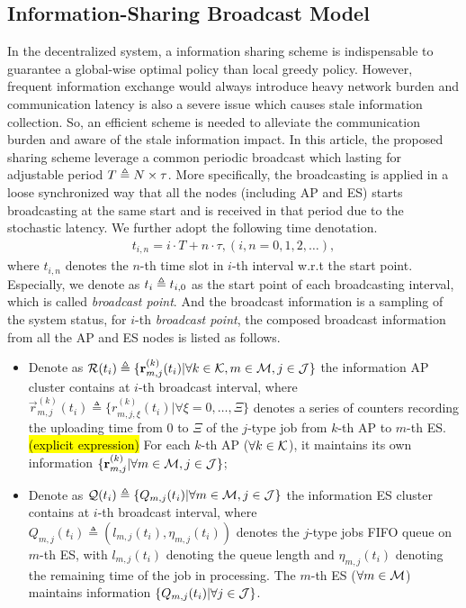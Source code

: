 \subsection{Information-Sharing Broadcast Model}
In the decentralized system, a information sharing scheme is indispensable to guarantee a global-wise optimal policy than local greedy policy.
However, frequent information exchange would always introduce heavy network burden and communication latency is also a severe issue which causes stale information collection. So, an efficient scheme is needed to alleviate the communication burden and aware of the stale information impact.
In this article, the proposed sharing scheme leverage a common periodic broadcast which lasting for adjustable period $T \triangleq N \times \tau$. More specifically, the broadcasting is applied in a loose synchronized way that all the nodes (including AP and ES) starts broadcasting at the same start and is received in that period due to the stochastic latency. We further adopt the following time denotation.
\begin{align}
    t_{i,n} = i \cdot T + n \cdot \tau, (i,n=0,1,2,\dots),
\end{align}
where $t_{i,n}$ denotes the $n$-th time slot in $i$-th interval w.r.t the start point. Especially, we denote as $t_{i} \triangleq t_{i,0}$ as the start point of each broadcasting interval, which is called \emph{broadcast point}.
And the broadcast information is a sampling of the system status, for $i$-th \emph{broadcast point}, the composed broadcast information from all the AP and ES nodes is listed as follows.
\begin{itemize}
    \item Denote as
    $\mathcal{R}(t_{i}) \triangleq \{ \mathbf{r}^{(k)}_{m,j}(t_i)|\forall k\in\mathcal{K}, m\in\mathcal{M}, j\in\mathcal{J} \}$
    the information AP cluster contains at $i$-th broadcast interval, where
    $\vec{r}^{(k)}_{m,j}(t_i) \triangleq \{ r^{(k)}_{m,j,\xi}(t_i)|\forall \xi=0,\dots,\Xi \}$
    denotes a series of counters recording the uploading time from $0$ to $\Xi$ of the $j$-type job from $k$-th AP to $m$-th ES.
    \hl{(explicit expression)}
    For each $k$-th AP ($\forall k\in\mathcal{K}$), it maintains its own information $\{ \mathbf{r}^{(k)}_{m,j} | \forall m\in\mathcal{M}, j\in\mathcal{J}\}$;
    \item Denote as
    $\mathcal{Q}(t_{i}) \triangleq \{ Q_{m,j}(t_i)|\forall m\in\mathcal{M},j\in\mathcal{J} \}$
    the information ES cluster contains at $i$-th broadcast interval, where
    $Q_{m,j}(t_i) \triangleq (l_{m,j}(t_i), \eta_{m,j}(t_i))$
    denotes the $j$-type jobs FIFO queue on $m$-th ES, with $l_{m,j}(t_i)$ denoting the queue length and $\eta_{m,j}(t_i)$ denoting the remaining time of the job in processing.
    The $m$-th ES ($\forall m\in\mathcal{M}$) maintains information $\{ Q_{m,j}(t_i)|\forall j\in\mathcal{J} \}$.
\end{itemize}
